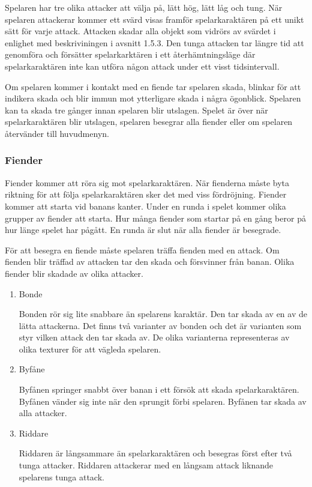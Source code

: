 \documentclass{TDP005mall}
\begin{document}
Spelaren har tre olika attacker att välja på, lätt hög, lätt låg och tung. 
När spelaren attackerar kommer ett svärd visas framför spelarkaraktären på ett unikt sätt för varje attack. 
Attacken skadar alla objekt som vidrörs av svärdet i enlighet med beskriviningen i avsnitt 1.5.3. 
Den tunga attacken tar längre tid att genomföra och försätter spelarkarktären i ett återhämtningsläge där spelarkaraktären inte kan utföra någon attack under ett visst tidsintervall.

Om spelaren kommer i kontakt med en fiende tar spelaren skada, blinkar för att indikera skada och blir immun mot ytterligare skada i några ögonblick. Spelaren kan ta skada tre gånger innan spelaren blir utslagen. Spelet är över när spelarkaraktären blir utslagen, spelaren besegrar alla fiender eller om spelaren återvänder till huvudmenyn.

\subsubsection{Fiender}
Fiender kommer att röra sig mot spelarkaraktären. 
När fienderna måste byta riktning för att följa spelarkaraktären sker det med viss fördröjning. 
Fiender kommer att starta vid banans kanter. 
Under en runda i spelet kommer olika grupper av fiender att starta. 
Hur många fiender som startar på en gång beror på hur länge spelet har pågått. En runda är slut när alla fiender är besegrade. 

För att besegra en fiende måste spelaren träffa fienden med en attack. Om fienden blir träffad av attacken tar den skada och försvinner från banan. Olika fiender blir skadade av olika attacker.

\begin{enumerate}
\item Bonde

    Bonden rör sig lite snabbare än spelarens karaktär. 
    Den tar skada av en av de lätta attackerna. 
    Det finns två varianter av bonden och det är varianten som styr vilken attack den tar skada av. 
    De olika varianterna representeras av olika texturer för att vägleda spelaren.
\item Byfåne

  Byfånen springer snabbt över banan i ett försök att skada spelarkaraktären. 
  Byfånen vänder sig inte när den sprungit förbi spelaren. 
  Byfånen tar skada av alla attacker.
\item Riddare

  Riddaren är långsammare än spelarkaraktären och besegras först efter två tunga attacker. 
  Riddaren attackerar med en långsam attack liknande spelarens tunga attack.


\end{enumerate}
\end{document}
